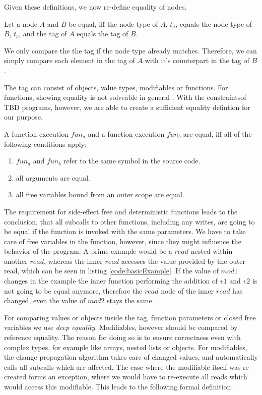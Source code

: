 Given these definitions, we now re-define equality of nodes. 

\begin{definition}
Let a node $A$ and $B$ be equal, iff the node type of $A$, $t_a$, equals the node type of $B$, $t_b$, and the tag of $A$ equals the tag of $B$. 
\end{definition}
We only compare the the tag if the node type already matches. Therefore, we can simply compare each element in the tag of $A$ with it's counterpart in the tag of $B$. 

The tag can consist of objects, value types, modifiables or functions. For functions, showing equality is not solveable in general \cite{church1936note}. With the constraintsof TBD programs, however, we are able to create a sufficient equality defintion for our purpose.
\begin{definition}
\label{def:fun_equality}
A function execution $fun_a$ and a function execution $fun_b$ are equal, iff all of the following conditions apply: 
\begin{enumerate}
\item $fun_a$ and $fun_b$ refer to the same symbol in the source code. 
\item all arguments are equal.
\item all free variables bound from an outer scope are equal. 
\end{enumerate}
\end{definition}

The requirement for side-effect free and deterministic functions leads to the conclusion, that all subcalls to other functions, including any writes, are going to be equal if the function is invoked with the same parameters. We have to take care of free variables in the function, however, since they might influence the behavior of the program. A prime example would be a $read$ nested within another $read$, whereas the inner $read$ accesses the value provided by the outer read, which can be seen in listing \ref{code:basicExample}. If the value of $mod1$ changes in the example the inner function performing the addition of $v1$ and $v2$ is not going to be equal anymore, therefore the $read$ node of the inner $read$ has changed, even the value of $mod2$ stays the same. 

For comparing values or objects inside the tag, function parameters or closed free variables we use \textit{deep equality}. Modifiables, however should be compared by reference equality. The reason for doing so is to ensure correctness even with complex types, for example like arrays, nested lists or objects. For modifiables, the change propagation algorithm takes care of changed values, and automatically calls all subcalls which are affected. The case where the modifiable itself was re-created forms an exception, where we would have to re-execute all reads which would access this modifiable. This leads to the following formal definition: 

